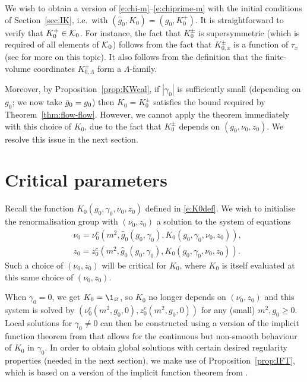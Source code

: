 We wish to obtain a version of \eqref{e:chi-m}--\eqref{e:chiprime-m}
with the initial conditions of Section~\ref{sec:IK}, i.e.\ with
$(\hat g_0, K_0) = (g_0, K^+_0)$.
It is straightforward to verify that $K^+_0 \in \mathcal{K}_0$.
For instance, the fact that $K^\pm_0$ is supersymmetric
(which is required of all elements of $\mathcal{K}_0$) follows
from the fact that $K^\pm_{0,x}$ is a function of $\tau_x$
(see \cite[Section~\ref{pt-sec:bulksym}]{BBS-rg-pt} for more on this topic).
It also follows from the definition that
the finite-volume coordinates $K^\pm_{0,\Lambda}$ form a $\Lambda$-family.

Moreover,
by Proposition~\ref{prop:KWcal}, if
$|\gamma_0|$ is sufficiently small (depending on $g_0$; we now take $\tilde{g}_0=g_0$)
then $K_0 = K^\pm_0$ satisfies the bound required by Theorem~\ref{thm:flow-flow}.
However, we cannot apply the theorem immediately with this choice
of $K_0$,
due to the fact that $K^\pm_0$
depends on $(g_0, \nu_0, z_0)$.
We resolve this issue in the next section.

\section{Critical parameters}
\label{sec:nu0z0c}

Recall the function $K_0(g_0, \gamma_0, \nu_0, z_0)$
defined in \eqref{e:K0def}.
We wish to initialise the renormalisation group with $(\nu_0, z_0)$ a solution
to the system of equations
\begin{align}
&\nu_0 = \nu_0^c(m^2, \hat g_0(g_0, \gamma_0), K_0(g_0, \gamma_0, \nu_0, z_0)), \label{e:mu0c}
\\
&z_0 = z_0^c(m^2, \hat g_0(g_0, \gamma_0), K_0(g_0, \gamma_0, \nu_0, z_0)) \label{e:z0c}
.
\end{align}
Such a choice of $(\nu_0, z_0)$ will be critical for $K_0$,
where $K_0$ is itself evaluated at this same choice of $(\nu_0, z_0)$.

When $\gamma_0 = 0$, we get $K_0 = \1_\varnothing$, so $K_0$ no longer depends on $(\nu_0, z_0)$
and this system is solved by $(\nu_0^c(m^2, g_0, 0), z_0^c(m^2, g_0, 0))$
for any (small) $m^2, g_0 \geq 0$.
Local solutions for $\gamma_0 \neq 0$ can then be
constructed using a version of the implicit function theorem from \cite{LS14}
that allows for the continuous but non-smooth behaviour of $K_0$ in $\gamma_0$.
In order to obtain global solutions with certain desired regularity properties
(needed in the next section), we make use of Proposition~\ref{prop:IFT},
which is based on a version of the implicit function theorem from \cite{LS14}.

